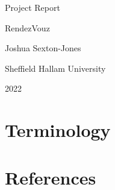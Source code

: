 \documentclass[a4paper,11pt]{report}
\newcommand{\projectname}{RendezVouz}
\begin{document}
\begin{titlepage}
  \centering
  \null %
  \vfill

  { 
    \bfseries 
    
    {\huge Project Report}
    
    {\large \projectname}
  }
  
  \vfill

  Joshua Sexton-Jones

  Sheffield Hallam University

  2022
\end{titlepage}





\tableofcontents \clearpage

\chapter{Terminology} 

\printglossary[type=ps]
\printglossary[type=t] \clearpage









\chapter{References} 
\printbibliography[heading=none]
\end{document}
